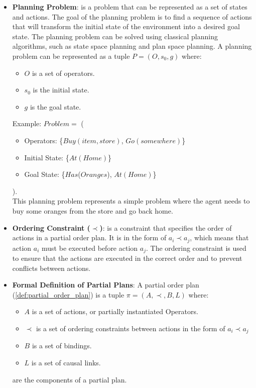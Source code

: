 \begin{itemize}
  \item \label{def:planning_problem}
        \textbf{Planning Problem}: is a problem that can be represented as a set of states and actions. The goal of the planning problem is to find a sequence of actions that will transform the initial state of the environment into a desired goal state. The planning problem can be solved using classical planning algorithms, such as state space planning and plan space planning. A planning problem can be represented as a tuple $P = (O, s_0, g)$ \cite{10.5555/975615} where:
        \begin{itemize}
          \item $O$ is a set of operators.
          \item $s_0$ is the initial state.
          \item $g$ is the goal state.
        \end{itemize}
        Example: $Problem =$ (
        \begin{itemize}
          \item Operators: \{$Buy(item,store)$, $Go(somewhere)$\}
          \item Initial State: \{$At(Home)$\}
          \item Goal State: \{$Has$($Oranges$), $At(Home)$\}
        \end{itemize}
        ).\\
        This planning problem represents a simple problem where the agent needs to buy some oranges from the store and go back home.

  \item  \label{def:ordering_constraint}
        \textbf{Ordering Constraint ($\prec$)}: is a constraint that specifies the order of actions in a partial order plan. It is in the form of $a_i \prec a_j$, which means that action $a_i$ must be executed before action $a_j$. The ordering constraint is used to ensure that the actions are executed in the correct order and to prevent conflicts between actions.

  \item  \label{def:formal_definition_partial_plan}
        \textbf{Formal Definition of Partial Plans}: A partial order plan (\ref{def:partial_order_plan}) is a tuple $\pi = (A, \prec, B, L)$ where: \cite{10.5555/975615}
        \begin{itemize}
          \item $A$ is a set of actions, or partially instantiated Operators.
          \item $\prec$ is a set of ordering constraints between actions in the form of $a_i \prec a_j$
          \item $B$ is a set of bindings.
          \item $L$ is a set of causal links.
        \end{itemize}
        are the components of a partial plan.



\end{itemize}

